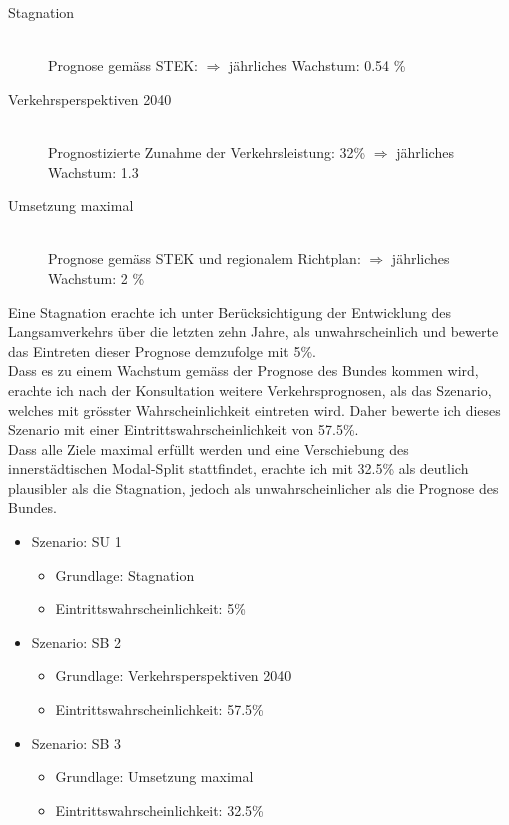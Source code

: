 \pagebreak

\begin{description}
\item[Stagnation] \hfill \\
Prognose gemäss STEK: $\Rightarrow$ jährliches Wachstum: 0.54 \% 
\item[Verkehrsperspektiven 2040] \hfill \\
Prognostizierte Zunahme der Verkehrsleistung: 32\% $\Rightarrow$ jährliches Wachstum: 1.3 
\item[Umsetzung maximal] \hfill \\
Prognose gemäss STEK und regionalem Richtplan: $\Rightarrow$ jährliches Wachstum: 2 \% 
\end{description}

Eine Stagnation erachte ich unter Berücksichtigung der Entwicklung des Langsamverkehrs über die letzten zehn Jahre, als unwahrscheinlich und bewerte das Eintreten dieser Prognose demzufolge mit 5\%. \\
Dass es zu einem Wachstum gemäss der Prognose des Bundes kommen wird, erachte ich nach der Konsultation weitere Verkehrsprognosen, als das Szenario, welches mit grösster Wahrscheinlichkeit eintreten wird. Daher bewerte ich dieses Szenario mit einer Eintrittswahrscheinlichkeit von 57.5\%. \\
Dass alle Ziele maximal erfüllt werden und eine Verschiebung des innerstädtischen Modal-Split stattfindet, erachte ich mit 32.5\% als deutlich plausibler als die Stagnation, jedoch als unwahrscheinlicher als die Prognose des Bundes. 

\begin{itemize}
\item Szenario: SU 1
	\begin{itemize}
	\item Grundlage: Stagnation 
	\item Eintrittswahrscheinlichkeit: 5\%
	\end{itemize}
\item Szenario: SB 2
	\begin{itemize}
	\item Grundlage: Verkehrsperspektiven 2040
	\item Eintrittswahrscheinlichkeit: 57.5\%
	\end{itemize}
\item Szenario: SB 3
	\begin{itemize}
	\item Grundlage: Umsetzung maximal
	\item Eintrittswahrscheinlichkeit: 32.5\%
	\end{itemize}
\end{itemize}

